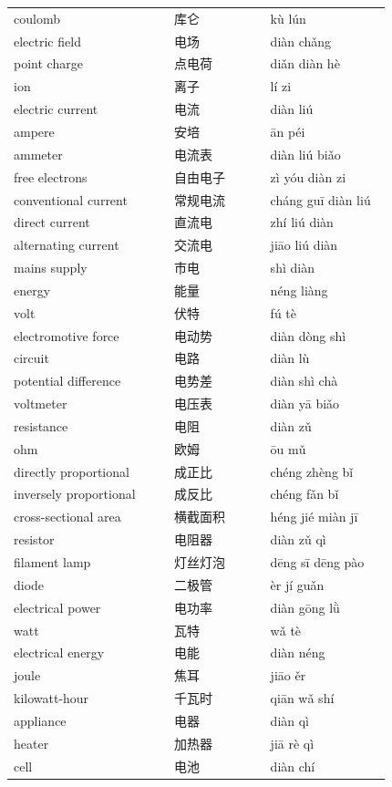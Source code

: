 \documentclass[11pt]{article}
\begin{document}
\begin{longtable}{@{}p{0.40\linewidth}p{0.24\linewidth}p{0.30\linewidth}@{}}
coulomb & 库仑 & kù lún \\
electric field & 电场 & diàn chǎng \\
point charge & 点电荷 & diǎn diàn hè \\
ion & 离子 & lí zi \\
electric current & 电流 & diàn liú \\
ampere & 安培 & ān péi \\
ammeter & 电流表 & diàn liú biǎo \\
free electrons & 自由电子 & zì yóu diàn zi \\
conventional current & 常规电流 & cháng guī diàn liú \\
direct current & 直流电 & zhí liú diàn \\
alternating current & 交流电 & jiāo liú diàn \\
mains supply & 市电 & shì diàn \\
energy & 能量 & néng liàng \\
volt & 伏特 & fú tè \\
electromotive force & 电动势 & diàn dòng shì \\
circuit & 电路 & diàn lù \\
potential difference & 电势差 & diàn shì chà \\
voltmeter & 电压表 & diàn yā biǎo \\
resistance & 电阻 & diàn zǔ \\
ohm & 欧姆 & ōu mǔ \\
directly proportional & 成正比 & chéng zhèng bǐ \\
inversely proportional & 成反比 & chéng fǎn bǐ \\
cross-sectional area & 横截面积 & héng jié miàn jī \\
resistor & 电阻器 & diàn zǔ qì \\
filament lamp & 灯丝灯泡 & dēng sī dēng pào \\
diode & 二极管 & èr jí guǎn \\
electrical power & 电功率 & diàn gōng lǜ \\
watt & 瓦特 & wǎ tè \\
electrical energy & 电能 & diàn néng \\
joule & 焦耳 & jiāo ěr \\
kilowatt-hour & 千瓦时 & qiān wǎ shí \\
appliance & 电器 & diàn qì \\
heater & 加热器 & jiā rè qì \\
cell & 电池 & diàn chí \\

\end{longtable}
\end{document}

